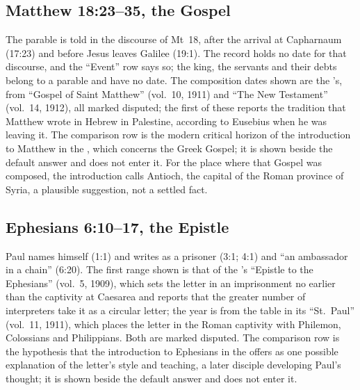 \subsection{Matthew 18:23--35, the Gospel}
\label{sec:date-matthew}

The parable is told in the discourse of Mt~18, after the arrival at Capharnaum
(17:23) and before Jesus leaves Galilee (19:1). The record holds no date for that
discourse, and the ``Event'' row says so; the king, the servants and their debts
belong to a parable and have no date. The composition dates shown are the
's, from ``Gospel of Saint Matthew'' (vol.~10, 1911) and
``The New Testament'' (vol.~14, 1912), all marked disputed; the first of these
reports the tradition that Matthew wrote in Hebrew in Palestine, according to
Eusebius when he was leaving it.
The comparison row is the modern critical horizon of the introduction to Matthew in
the , which concerns the Greek Gospel; it is
shown beside the default answer and does not enter it. For the place where that
Gospel was composed, the introduction calls Antioch, the capital of the Roman
province of Syria, a plausible suggestion, not a settled fact.

\subsection{Ephesians 6:10--17, the Epistle}
\label{sec:date-ephesians}

Paul names himself (1:1) and writes as a prisoner (3:1; 4:1) and ``an ambassador in
a chain'' (6:20). The first range shown is that of the 's ``Epistle to the Ephesians'' (vol.~5, 1909), which sets the letter in
an imprisonment no earlier than the captivity at Caesarea and reports that the
greater number of interpreters take it as a circular letter; the year is from the
table in its ``St.\ Paul'' (vol.~11, 1911), which places the letter in the Roman
captivity with Philemon, Colossians and Philippians. Both are marked disputed. The
comparison row is the hypothesis that the introduction to Ephesians in the  offers as one possible explanation of the letter's
style and teaching, a later disciple developing Paul's thought; it is shown beside
the default answer and does not enter it.
